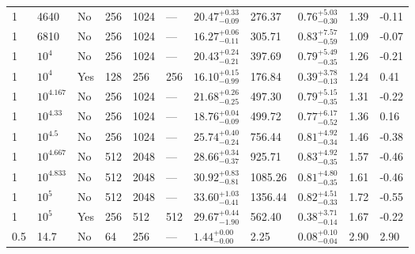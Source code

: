 \documentclass[aps, prfluids, onecolumn, notitlepage, nofootinbib, groupedaddress, amsfonts, amssymb, amsmath]{revtex4-1}
\begin{document}
\begin{center}
\begin{longtable}{ p{1cm} p{1cm} p{1cm} p{1cm} p{1cm} p{1cm} p{1.75cm} p{1.5cm} p{2.75cm} p{1cm} p{1.2cm}  }
\vspace{0.08cm}1	&	4640	&	No	&	256	&	1024	&	---	&$	20.47	_{-	0.09	}^{+	0.33	}$&	276.37	&$	0.76	_{-	0.30	}^{+	5.03	}$&	1.39	&	-0.11	\\
\vspace{0.08cm}1	&	6810	&	No	&	256	&	1024	&	---	&$	16.27	_{-	0.11	}^{+	0.06	}$&	305.71	&$	0.83	_{-	0.59	}^{+	7.57	}$&	1.09	&	-0.07	\\
\vspace{0.08cm}1	&	$10^4$	&	No	&	256	&	1024	&	---	&$	20.43	_{-	0.21	}^{+	0.24	}$&	397.69	&$	0.79	_{-	0.35	}^{+	5.49	}$&	1.26	&	-0.21	\\
\vspace{0.08cm}1	&	$10^4$	&	Yes	&	128	&	256	&	256	&$	16.10	_{-	0.99	}^{+	0.15	}$&	176.84	&$	0.39	_{-	0.13	}^{+	3.78	}$&	1.24	&	0.41	\\
\vspace{0.08cm}1	&	$10^{4.167}$	&	No	&	256	&	1024	&	---	&$	21.68	_{-	0.25	}^{+	0.26	}$&	497.30	&$	0.79	_{-	0.35	}^{+	5.15	}$&	1.31	&	-0.22	\\
\vspace{0.08cm}1	&	$10^{4.33}$	&	No	&	256	&	1024	&	---	&$	18.76	_{-	0.09	}^{+	0.04	}$&	499.72	&$	0.77	_{-	0.52	}^{+	6.17	}$&	1.36	&	0.16	\\
\vspace{0.08cm}1	&	$10^{4.5}$	&	No	&	256	&	1024	&	---	&$	25.74	_{-	0.24	}^{+	0.40	}$&	756.44	&$	0.81	_{-	0.34	}^{+	4.92	}$&	1.46	&	-0.38	\\
\vspace{0.08cm}1	&	$10^{4.667}$	&	No	&	512	&	2048	&	---	&$	28.66	_{-	0.37	}^{+	0.34	}$&	925.71	&$	0.83	_{-	0.35	}^{+	4.92	}$&	1.57	&	-0.46	\\
\vspace{0.08cm}1	&	$10^{4.833}$	&	No	&	512	&	2048	&	---	&$	30.92	_{-	0.81	}^{+	0.83	}$&	1085.26	&$	0.81	_{-	0.35	}^{+	4.80	}$&	1.61	&	-0.46	\\
\vspace{0.08cm}1	&	$10^5$	&	No	&	512	&	2048	&	---	&$	33.60	_{-	0.41	}^{+	1.03	}$&	1356.44	&$	0.82	_{-	0.33	}^{+	4.51	}$&	1.72	&	-0.55	\\
\vspace{0.08cm}1	&	$10^5$	&	Yes	&	256	&	512	&	512	&$	29.67	_{-	1.90	}^{+	0.44	}$&	562.40	&$	0.38	_{-	0.14	}^{+	3.71	}$&	1.67	&	-0.22	\\
\vspace{0.08cm}0.5	&	14.7	&	No	&	64	&	256	&	---	&$	1.44	_{-	0.00	}^{+	0.00	}$&	2.25	&$	0.08	_{-	0.04	}^{+	0.10	}$&	2.90	&	2.90	\\

\end{longtable}
\end{center}
\end{document}
